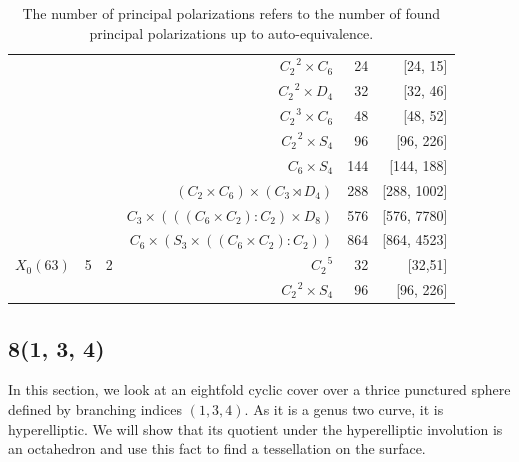 \documentclass[12pt,reqno]{amsart}
\theoremstyle{definition}
\theoremstyle{remark}
\begin{document}
\begin{table}[H]
\begin{tabular}{ l | c c r r r}
& & & $C_2^{\text{ } 2} \times C_6$  & 24  & [24, 15] \\
 
& & & $C_2^{\text{ } 2} \times D_4$  & 32 & [32, 46] \\
 
& & 	& $C_2^{\text{ }3} \times C_6$ & 48 &  [48, 52] \\
 

& & & $C_2^{\text{ }2}\times S_4$ & 96 & [96, 226] \\

& & & $C_6 \times S_4$ & 144 & [144, 188] \\

& & & $(C_2 \times C_6) \times (C_3 \rtimes D_4)$  & 288 & [288, 1002]  \\

& & & $C_3 \times (((C_6 \times C_2) : C_2) \times D_8)$ & 576 & [576, 7780] \\ 

& & & $C_6 \times (S_3 \times ((C_6 \times C_2) : C_2))$ & 864 & [864, 4523] \\ \hline

$X_0(63)$ & 5 & 2 & $C_2^{\text{ }5}$ & 32 & [32,51] \\
& & & $C_2 ^{\text{ }2} \times S_4$ &  96 & [96, 226] \\ \hline
\end{tabular}
\label{table:pp} 
\caption*{The number of principal polarizations refers to the number of found principal polarizations up to auto-equivalence.}
\end{table}




\subsection{8(1, 3, 4)}

In this section, we look at an eightfold cyclic cover over a thrice punctured sphere defined by branching indices $(1, 3, 4).$ As it is a genus two curve, it is hyperelliptic. We will show that its quotient under the hyperelliptic involution is an octahedron and use this fact to find a tessellation on the surface. 
\end{document}
